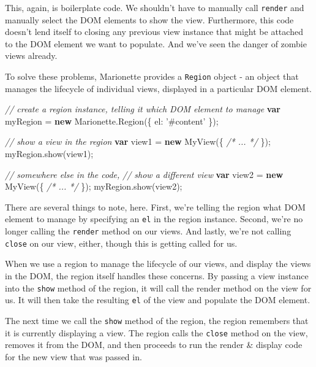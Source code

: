 \documentclass[9pt]{book}
\newenvironment{Shaded}{}{}
\newcommand{\KeywordTok}[1]{\textcolor[rgb]{0.00,0.44,0.13}{\textbf{{#1}}}}
\newcommand{\DataTypeTok}[1]{\textcolor[rgb]{0.56,0.13,0.00}{{#1}}}
\newcommand{\StringTok}[1]{\textcolor[rgb]{0.25,0.44,0.63}{{#1}}}
\newcommand{\CommentTok}[1]{\textcolor[rgb]{0.38,0.63,0.69}{\textit{{#1}}}}
\newcommand{\OtherTok}[1]{\textcolor[rgb]{0.00,0.44,0.13}{{#1}}}
\newcommand{\FunctionTok}[1]{\textcolor[rgb]{0.02,0.16,0.49}{{#1}}}
\newcommand{\NormalTok}[1]{{#1}}
\begin{document}
This, again, is boilerplate code. We shouldn't have to manually call
\texttt{render} and manually select the DOM elements to show the view.
Furthermore, this code doesn't lend itself to closing any previous view
instance that might be attached to the DOM element we want to populate.
And we've seen the danger of zombie views already.

To solve these problems, Marionette provides a \texttt{Region} object -
an object that manages the lifecycle of individual views, displayed in a
particular DOM element.

\begin{Shaded}
\begin{Highlighting}[]
\CommentTok{// create a region instance, telling it which DOM element to manage}
\KeywordTok{var} \NormalTok{myRegion = }\KeywordTok{new} \OtherTok{Marionette}\NormalTok{.}\FunctionTok{Region}\NormalTok{(\{}
  \DataTypeTok{el}\NormalTok{: }\StringTok{'#content'}
\NormalTok{\});}

\CommentTok{// show a view in the region}
\KeywordTok{var} \NormalTok{view1 = }\KeywordTok{new} \FunctionTok{MyView}\NormalTok{(\{ }\CommentTok{/* ... */} \NormalTok{\});}
\OtherTok{myRegion}\NormalTok{.}\FunctionTok{show}\NormalTok{(view1);}

\CommentTok{// somewhere else in the code,}
\CommentTok{// show a different view}
\KeywordTok{var} \NormalTok{view2 = }\KeywordTok{new} \FunctionTok{MyView}\NormalTok{(\{ }\CommentTok{/* ... */} \NormalTok{\});}
\OtherTok{myRegion}\NormalTok{.}\FunctionTok{show}\NormalTok{(view2);}
\end{Highlighting}
\end{Shaded}

There are several things to note, here. First, we're telling the region
what DOM element to manage by specifying an \texttt{el} in the region
instance. Second, we're no longer calling the \texttt{render} method on
our views. And lastly, we're not calling \texttt{close} on our view,
either, though this is getting called for us.

When we use a region to manage the lifecycle of our views, and display
the views in the DOM, the region itself handles these concerns. By
passing a view instance into the \texttt{show} method of the region, it
will call the render method on the view for us. It will then take the
resulting \texttt{el} of the view and populate the DOM element.

The next time we call the \texttt{show} method of the region, the region
remembers that it is currently displaying a view. The region calls the
\texttt{close} method on the view, removes it from the DOM, and then
proceeds to run the render \& display code for the new view that was
passed in.
\end{document}
